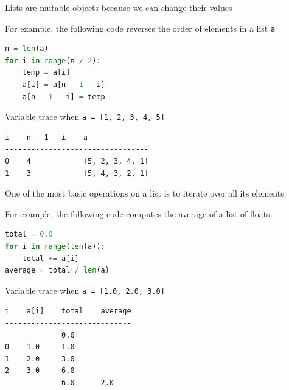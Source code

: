 \documentclass[8pt,a4paper,compress]{beamer}
\begin{document}
\begin{frame}[fragile]
\pause

Lists are mutable objects because we can change their values

\pause
\bigskip

For example, the following code reverses the order of elements in a list \lstinline{a}

\begin{lstlisting}[language=Python]
n = len(a)
for i in range(n / 2):
    temp = a[i]
    a[i] = a[n - 1 - i]
    a[n - 1 - i] = temp
\end{lstlisting}

\pause

Variable trace when \lstinline{a = [1, 2, 3, 4, 5]}
\begin{lstlisting}[language={}]
i    n - 1 - i    a
---------------------------------
0    4            [5, 2, 3, 4, 1]
1    3            [5, 4, 3, 2, 1]
\end{lstlisting} 

\pause
\bigskip

One of the most basic operations on a list is to iterate over all its elements

\pause
\bigskip

For example, the following code computes the average of a list of floats

\begin{lstlisting}[language=Python]
total = 0.0
for i in range(len(a)):
    total += a[i]
average = total / len(a)
\end{lstlisting}

\pause

Variable trace when \lstinline{a = [1.0, 2.0, 3.0]}
\begin{lstlisting}[language={}]
i    a[i]    total    average
-----------------------------
             0.0
0    1.0     1.0
1    2.0     3.0
2    3.0     6.0
             6.0      2.0
\end{lstlisting} 
\end{frame}
\end{document}
